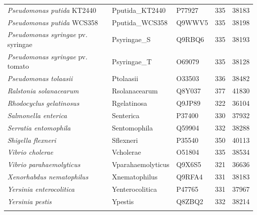 \begin{table}
\begin{minipage}[c]{\textwidth}
\begin{narrow}{-1in}{-1in}
\begin{small}
\begin{tabular}{@{}llp{.8in}p{.8in}p{.7in}@{}}
{\it Pseudomonas putida} KT2440 & Pputida\_KT2440  & P77927 & 335 & 38183 \\

{\it Pseudomonas putida} WCS358 & Pputida\_WCS358  & Q9WWV5 & 335 & 38198 \\

{\it Pseudomonas syringae} pv. syringae & Psyringae\_S & Q9RBQ6 & 335 & 38193 \\

{\it Pseudomonas syringae} pv. tomato & Psyringae\_T & O69079 & 335 & 38128 \\

{\it Pseudomonas tolaasii} & Ptolaasii & O33503 & 336 & 38482 \\

{\it Ralstonia solanacearum } & Rsolanacearum & Q8Y037 & 377 & 41830 \\

{\it Rhodocyclus gelatinosus } & Rgelatinosa & Q9JP89 & 322 & 36104 \\

{\it Salmonella enterica} & Senterica & P37400 & 330 & 37932 \\

{\it Serratia entomophila} & Sentomophila & Q59904 & 332 & 38288 \\

{\it Shigella flexneri} & Sflexneri & P35540 & 350 & 40113 \\

{\it Vibrio cholerae} & Vcholerae & O51804 & 335 & 38534 \\

{\it Vibrio parahaemolyticus} & Vparahaemolyticus & Q9X6S5 & 321 & 36636 \\

{\it Xenorhabdus nematophilus} & Xnematophilus & Q9RFA4 & 331 & 38183 \\

{\it Yersinia enterocolitica} & Yenterocolitica & P47765 & 331 & 37967 \\

{\it Yersinia pestis} & Ypestis & Q8ZBQ2 & 332 & 38214
\\\addlinespace\bottomrule

\end{tabular}
\end{small}
\end{narrow}
\end{minipage}
\end{table}


